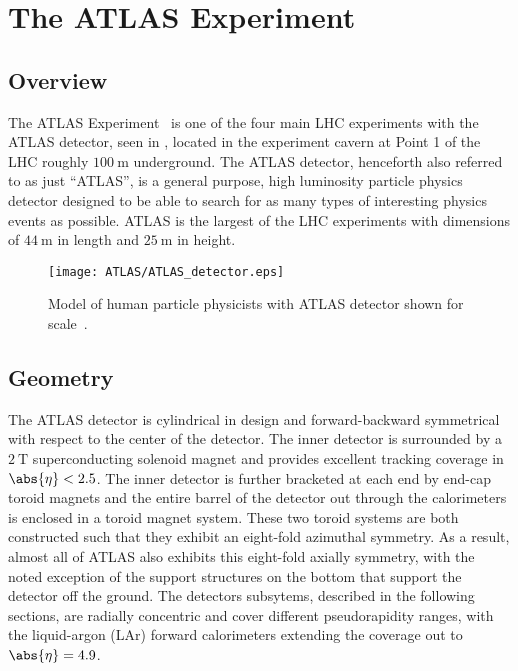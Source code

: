 \chapter{The ATLAS Experiment}\label{chapter:ATLAS}

\section{Overview}\label{sec:ATLAS_overview}

The ATLAS Experiment~\cite{PERF-2007-01} is one of the four main LHC experiments with the ATLAS detector, seen in , located in the experiment cavern at Point 1 of the LHC roughly $100~\textrm{m}$ underground.
The ATLAS detector, henceforth also referred to as just ``ATLAS'', is a general purpose, high luminosity particle physics detector designed to be able to search for as many types of interesting physics events as possible.
ATLAS is the largest of the LHC experiments with dimensions of $44~\mathrm{m}$ in length and $25~\mathrm{m}$ in height.

\begin{figure}[htbp]
 \centering
 \texttt{[image: ATLAS/ATLAS\_detector.eps]}
 \caption[Cut-away view of the ATLAS detector.]{%
  Model of human particle physicists with ATLAS detector shown for scale~\cite{Pequenao:1095924}.}\label{fig:ATLAS_detector}
\end{figure}

\section{Geometry}\label{sec:ATLAS_geometry}

The ATLAS detector is cylindrical in design and forward-backward symmetrical with respect to the center of the detector.
The inner detector is surrounded by a $2~\mathrm{T}$ superconducting solenoid magnet and provides excellent tracking coverage in $\abs{\eta} < 2.5$.
The inner detector is further bracketed at each end by end-cap toroid magnets and the entire barrel of the detector out through the calorimeters is enclosed in a toroid magnet system.
These two toroid systems are both constructed such that they exhibit an eight-fold azimuthal symmetry.
As a result, almost all of ATLAS also exhibits this eight-fold axially symmetry, with the noted exception of the support structures on the bottom that support the detector off the ground.
The detectors subsytems, described in the following sections, are radially concentric and cover different pseudorapidity ranges, with the liquid-argon (LAr) forward calorimeters extending the coverage out to $\abs{\eta} = 4.9$.

